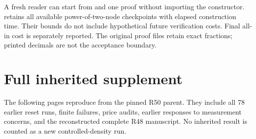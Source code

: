 A fresh reader can start from  and one proof without importing the constructor.  retains all available power-of-two-node checkpoints with elapsed construction time. Their bounds do not include hypothetical future verification costs. Final all-in cost is separately reported. The original proof files retain exact fractions; printed decimals are not the acceptance boundary.

\section{Full inherited supplement}
The following pages reproduce  from the pinned R50 parent. They include all 78 earlier reset runs, finite failures, price audits, earlier responses to measurement concerns, and the reconstructed complete R48 manuscript. No inherited result is counted as a new controlled-density run.

